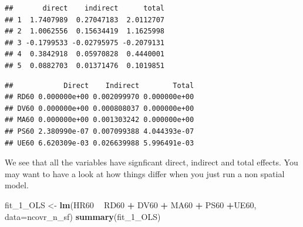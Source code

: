 \documentclass[]{book}
\newenvironment{Shaded}{\begin{snugshade}}{\end{snugshade}}
\newcommand{\CommentTok}[1]{\textcolor[rgb]{0.56,0.35,0.01}{\textit{#1}}}
\newcommand{\DataTypeTok}[1]{\textcolor[rgb]{0.13,0.29,0.53}{#1}}
\newcommand{\DecValTok}[1]{\textcolor[rgb]{0.00,0.00,0.81}{#1}}
\newcommand{\KeywordTok}[1]{\textcolor[rgb]{0.13,0.29,0.53}{\textbf{#1}}}
\newcommand{\NormalTok}[1]{#1}
\newcommand{\OperatorTok}[1]{\textcolor[rgb]{0.81,0.36,0.00}{\textbf{#1}}}
\newcommand{\StringTok}[1]{\textcolor[rgb]{0.31,0.60,0.02}{#1}}
\begin{document}
\begin{Shaded}
\end{Shaded}

\begin{verbatim}
##       direct    indirect      total
## 1  1.7407989  0.27047183  2.0112707
## 2  1.0062556  0.15634419  1.1625998
## 3 -0.1799533 -0.02795975 -0.2079131
## 4  0.3842918  0.05970828  0.4440001
## 5  0.0882703  0.01371476  0.1019851
\end{verbatim}

\begin{Shaded}
\end{Shaded}

\begin{verbatim}
##            Direct    Indirect        Total
## RD60 0.000000e+00 0.002099970 0.000000e+00
## DV60 0.000000e+00 0.000808037 0.000000e+00
## MA60 0.000000e+00 0.001303242 0.000000e+00
## PS60 2.380990e-07 0.007099388 4.044393e-07
## UE60 6.620309e-03 0.026639988 5.996491e-03
\end{verbatim}

We see that all the variables have signficant direct, indirect and total effects. You may want to have a look at how things differ when you just run a non spatial model.

\begin{Shaded}
\begin{Highlighting}[]
\NormalTok{fit_}\DecValTok{1}\NormalTok{_OLS <-}\StringTok{ }\KeywordTok{lm}\NormalTok{(HR60 }\OperatorTok{~}\StringTok{ }\NormalTok{RD60 }\OperatorTok{+}\StringTok{ }\NormalTok{DV60 }\OperatorTok{+}\StringTok{ }\NormalTok{MA60 }\OperatorTok{+}\StringTok{ }\NormalTok{PS60 }\OperatorTok{+}\NormalTok{UE60, }\DataTypeTok{data=}\NormalTok{ncovr_n_sf)}
\KeywordTok{summary}\NormalTok{(fit_}\DecValTok{1}\NormalTok{_OLS)}
\end{Highlighting}
\end{Shaded}
\end{document}
